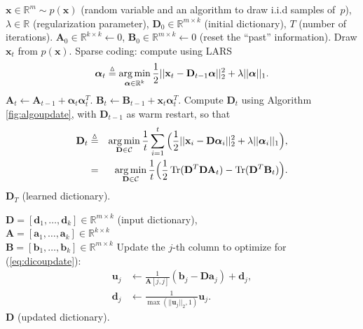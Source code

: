 \documentclass[twoside,11pt]{article}
\def\x{{\mathbf x}}
\def\a{{\mathbf a}}
\def\alphab{{\boldsymbol\alpha}}
\def\D{{\mathbf D}}
\def\B{{\mathbf B}}
\def\d{{\mathbf d}}
\def\C{{\mathcal C}}
\def\d{{\mathbf d}}
\def\b{{\mathbf b}}
\def\u{{\mathbf u}}
\def\Real{{\mathbb R}}
\def\u{{\mathbf u}}
\def\A{{\mathbf A}}
\def\argmin{\operatornamewithlimits{arg\,min}}
\def\trace{\operatorname{Tr}}
\def\defin{\stackrel{\vartriangle}{=}}
\begin{document}
\begin{algorithm}[t]%
   \caption{Online dictionary learning.}
   \label{fig:algoonline}
   \begin{algorithmic}[1]
      \REQUIRE $\x \in \Real^m \sim p(\x)$ (random variable and an algorithm
      to draw i.i.d samples of~$p$), $\lambda \in \Real$ (regularization
      parameter), $\D_0 \in \Real^{m \times k}$ (initial dictionary), $T$
      (number of iterations).
      \STATE $\A_0 \in \Real^{k \times k} \leftarrow 0$, 
      $\B_0 \in \Real^{m \times k} \leftarrow 0$ (reset the ``past''
      information). 
      \STATE Draw $\x_t$ from $p(\x)$. 
      \STATE Sparse coding: compute using LARS 
      \begin{displaymath} 
         \alphab_t  \defin  \argmin_{\alphab \in
         \Real^k} \frac{1}{2}||\x_t-\D_{t-1}\alphab||_2^2 +
         \lambda||\alphab||_1. 
      \end{displaymath}
      \STATE $\A_t \leftarrow \A_{t-1} + \alphab_t \alphab_t^T$. 
      \STATE $\B_t \leftarrow \B_{t-1} + \x_t \alphab_t^T$.
      \STATE Compute $\D_t$ using Algorithm
      \ref{fig:algoupdate}, with $\D_{t-1}$ as warm restart, so that
      \begin{eqnarray}
         \D_t & \defin &\argmin_{\D \in \C} \frac{1}{t}\sum_{i=1}^t
         \Big(\frac{1}{2}||\x_i-\D\alphab_i||_2^2 + \lambda||\alphab_i||_1\Big),\nonumber \\
         & = & \argmin_{\D \in \C} \frac{1}{t}\Big( \frac{1}{2}\trace(\D^T\D\A_t) - \trace(\D^T\B_t)\Big).
	  \label{eq:dicoupdate}
      \end{eqnarray}
   \ENDFOR
   \RETURN $\D_T$ (learned dictionary).
\end{algorithmic}
\end{algorithm}
\begin{algorithm}[hbtp]
   \caption{Dictionary Update.}
   \label{fig:algoupdate}
   \begin{algorithmic}[1]
      \REQUIRE $\D = [\d_1,\ldots,\d_k] \in \Real^{m \times k}$ (input dictionary), \\
      $\A = [\a_1,\ldots,\a_k] \in \Real^{k \times k}$ \\
      $\B =[\b_1,\ldots,\b_k] \in \Real^{m \times k}$
      \REPEAT
      \STATE Update the $j$-th column to optimize for (\ref{eq:dicoupdate}): 
      \begin{equation} 
         \begin{split}
            \u_j &\leftarrow \frac{1}{\A[j,j]}(\b_j-\D\a_j) + \d_j, \\
            \d_j &\leftarrow \frac{1}{\max(||\u_j||_2,1)}\u_j. \label{eq:updated}
         \end{split}
      \end{equation}
   \ENDFOR
   \RETURN $\D$ (updated dictionary).
\end{algorithmic}
\end{algorithm}
\end{document}
